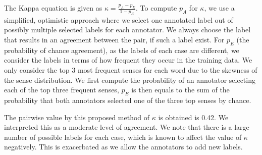 {The Kappa equation is given as 
$\kappa = \frac{p_A - p_E}{1 - p_E} $.
To compute $p_A$ for $\kappa$, we use a simplified, optimistic approach where we select one annotated label out of possibly multiple selected labels for each annotator. We always choose the label that results in an agreement between the pair, if such a label exist. For $p_E$ (the probability of chance agreement), as the labels of each case are different, we consider the labels in terms of how frequent they occur in the training data. 
We only consider the top 3 most frequent senses for each word %
due to the skewness of the sense distribution. 
We first compute the probability of an annotator selecting each of the top three frequent senses, $p_E$ is then equals to the sum of the probability that both annotators selected one of the three top senses by chance. 

The pairwise value by this proposed method of $\kappa$ is obtained is 0.42. We interpreted this as a moderate level of agreement. We note that there is a large number of possible labels for each case, which is known to affect the value of $\kappa$ negatively. This is exacerbated as we allow the annotators to add new labels. 


}

